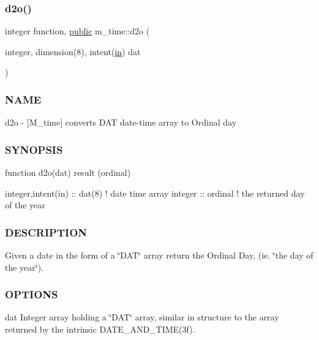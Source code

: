 \mbox{\label{namespacem__time_a727dd77bbd4a5d0e3947c5d303845947}} 
\subsubsection{\texorpdfstring{d2o()}{d2o()}}
{\footnotesize\ttfamily integer function, \hyperlink{M__stopwatch_83_8txt_a2f74811300c361e53b430611a7d1769f}{public} m\+\_\+time\+::d2o (\begin{DoxyParamCaption}\item[{integer, dimension(8), intent(\hyperlink{M__journal_83_8txt_afce72651d1eed785a2132bee863b2f38}{in})}]{dat }\end{DoxyParamCaption})}



\subsubsection*{N\+A\+ME}

d2o -\/ \mbox{[}M\+\_\+time\mbox{]} converts D\+AT date-\/time array to Ordinal day 

\subsubsection*{S\+Y\+N\+O\+P\+S\+IS}

\begin{DoxyVerb}function d2o(dat) result (ordinal)

 integer,intent(in) :: dat(8)   ! date time array
 integer            :: ordinal  ! the returned day of the year
\end{DoxyVerb}


\subsubsection*{D\+E\+S\+C\+R\+I\+P\+T\+I\+ON}

Given a date in the form of a \char`\"{}\+D\+A\+T\char`\"{} array return the Ordinal Day, (ie. \char`\"{}the day of the year\char`\"{}).

\subsubsection*{O\+P\+T\+I\+O\+NS}

dat Integer array holding a \char`\"{}\+D\+A\+T\char`\"{} array, similar in structure to the array returned by the intrinsic D\+A\+T\+E\+\_\+\+A\+N\+D\+\_\+\+T\+I\+M\+E(3f).

